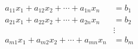 \documentclass[preview]{standalone}
\begin{document}
\begin{align*} 
a_{11}x_1 + a_{12}x_2 + \cdots + a_{1n}x_n  &=  b_1 \\ 
a_{21}x_1 + a_{22}x_2 + \cdots + a_{2n}x_n  &=  b_2 \\ 
\; &  \vdots \\ 
a_{m1}x_1 + a_{m2}x_2 + \cdots + a_{mn}x_n  &=  b_m 
\end{align*}
\end{document}

